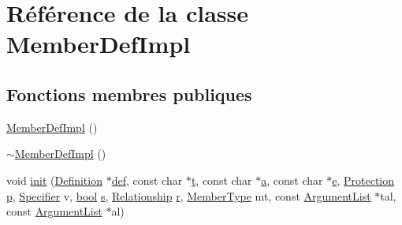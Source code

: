 \hypertarget{class_member_def_impl}{}\section{Référence de la classe Member\+Def\+Impl}
\label{class_member_def_impl}
\subsection*{Fonctions membres publiques}
\begin{DoxyCompactItemize}
\item 
\hyperlink{class_member_def_impl_ab45c82c4279a4037d79157369ae3ffa0}{Member\+Def\+Impl} ()
\item 
\hyperlink{class_member_def_impl_a37c9d558b635898c74a439fec45c72a4}{$\sim$\+Member\+Def\+Impl} ()
\item 
void \hyperlink{class_member_def_impl_a3e0578f4470c0b2ed544a2805eb86b1d}{init} (\hyperlink{class_definition}{Definition} $\ast$\hyperlink{class_member_def_impl_a27a432e4fe7f8fb2f33b570ee665a4c6}{def}, const char $\ast$\hyperlink{058__bracket__recursion_8tcl_a69e959f6901827e4d8271aeaa5fba0fc}{t}, const char $\ast$\hyperlink{060__command__switch_8tcl_ab08ae027fc5777bc4f0629f1b60b35db}{a}, const char $\ast$\hyperlink{060__command__switch_8tcl_aff65a51a703804e0ad1adbcfd76c86f8}{e}, \hyperlink{types_8h_a90e352184df58cd09455fe9996cd4ded}{Protection} \hyperlink{060__command__switch_8tcl_a15229b450f26d8fa1c10bea4f3279f4d}{p}, \hyperlink{types_8h_ab16236bdd10ddf4d73a9847350f0017e}{Specifier} v, \hyperlink{qglobal_8h_a1062901a7428fdd9c7f180f5e01ea056}{bool} \hyperlink{060__command__switch_8tcl_a011c73f2dbb87635a3b4206c72355f6e}{s}, \hyperlink{types_8h_a9d625fe894d9313ec78df1d78553f32e}{Relationship} \hyperlink{060__command__switch_8tcl_a0a0bd3dc69dd06934c4e6362155e0ace}{r}, \hyperlink{types_8h_a63e3de542c5d38de617ab78c8c8f5a41}{Member\+Type} mt, const \hyperlink{class_argument_list}{Argument\+List} $\ast$tal, const \hyperlink{class_argument_list}{Argument\+List} $\ast$al)
\end{DoxyCompactItemize}
